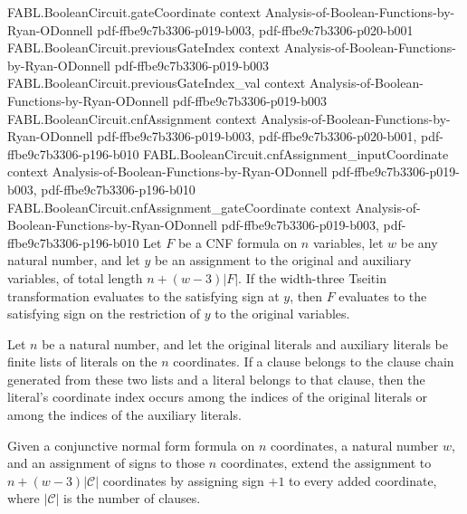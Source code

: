 \begin{theorem}
\proofstep
  {FABL.BooleanCircuit.gateCoordinate}
  {context}
  {Analysis-of-Boolean-Functions-by-Ryan-ODonnell}
  {pdf-ffbe9c7b3306-p019-b003,
    pdf-ffbe9c7b3306-p020-b001}
\proofstep
  {FABL.BooleanCircuit.previousGateIndex}
  {context}
  {Analysis-of-Boolean-Functions-by-Ryan-ODonnell}
  {pdf-ffbe9c7b3306-p019-b003}
\proofstep
  {FABL.BooleanCircuit.previousGateIndex_val}
  {context}
  {Analysis-of-Boolean-Functions-by-Ryan-ODonnell}
  {pdf-ffbe9c7b3306-p019-b003}
\proofstep
  {FABL.BooleanCircuit.cnfAssignment}
  {context}
  {Analysis-of-Boolean-Functions-by-Ryan-ODonnell}
  {pdf-ffbe9c7b3306-p019-b003,
    pdf-ffbe9c7b3306-p020-b001,
    pdf-ffbe9c7b3306-p196-b010}
\proofstep
  {FABL.BooleanCircuit.cnfAssignment_inputCoordinate}
  {context}
  {Analysis-of-Boolean-Functions-by-Ryan-ODonnell}
  {pdf-ffbe9c7b3306-p019-b003,
    pdf-ffbe9c7b3306-p196-b010}
\proofstep
  {FABL.BooleanCircuit.cnfAssignment_gateCoordinate}
  {context}
  {Analysis-of-Boolean-Functions-by-Ryan-ODonnell}
  {pdf-ffbe9c7b3306-p019-b003,
    pdf-ffbe9c7b3306-p196-b010}
Let $F$ be a CNF formula on $n$ variables, let $w$ be any natural number, and let $y$ be
an assignment to the original and auxiliary variables, of total length $n+(w-3)|F|$. If
the width-three Tseitin transformation evaluates to the satisfying sign at $y$, then $F$
evaluates to the satisfying sign on the restriction of $y$ to the original variables.
\end{theorem}

\begin{theorem}
\label{FABL.index_mem_original_or_auxiliary_of_mem_tseitinClauseChain}
\leanok
{}
Let $n$ be a natural number, and let the original literals and auxiliary literals be
finite lists of literals on the $n$ coordinates. If a clause belongs to the clause chain
generated from these two lists and a literal belongs to that clause, then the literal's
coordinate index occurs among the indices of the original literals or among the indices
of the auxiliary literals.
\end{theorem}

\begin{definition}
\label{FABL.widthThreeTseitinBaseAssignment}
\leanok
{}
Given a conjunctive normal form formula on $n$ coordinates, a natural number $w$, and an
assignment of signs to those $n$ coordinates, extend the assignment to $n+(w-3)|\mathcal
C|$ coordinates by assigning sign $+1$ to every added coordinate, where $|\mathcal C|$
is the number of clauses.
\end{definition}

